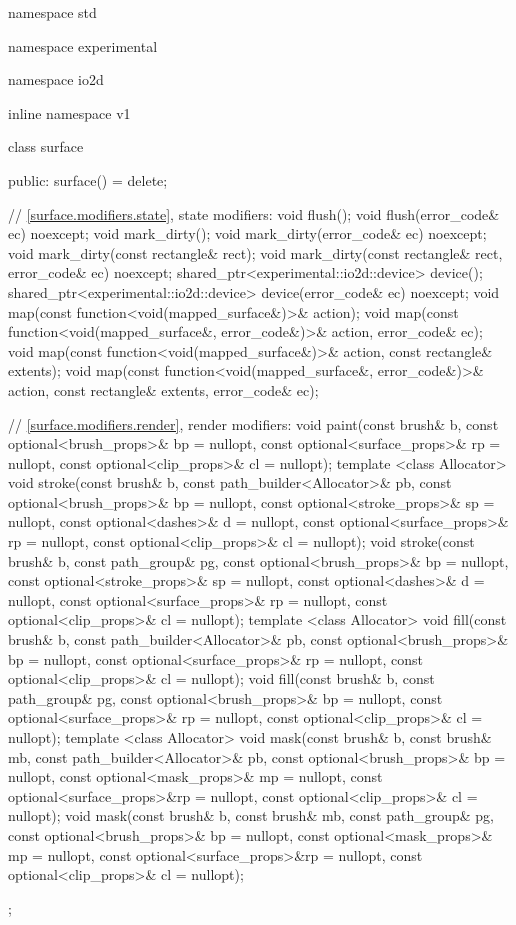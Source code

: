 \begin{codeblock}
namespace std { namespace experimental { namespace io2d { inline namespace v1 {
  class surface {
  public:
    surface() = delete;
    
    // \ref{surface.modifiers.state}, state modifiers:
    void flush();
    void flush(error_code& ec) noexcept;
    void mark_dirty();
    void mark_dirty(error_code& ec) noexcept;
    void mark_dirty(const rectangle& rect);
    void mark_dirty(const rectangle& rect, error_code& ec) noexcept;
    shared_ptr<experimental::io2d::device> device();
    shared_ptr<experimental::io2d::device> device(error_code& ec) noexcept;
    void map(const function<void(mapped_surface&)>& action);
    void map(const function<void(mapped_surface&, error_code&)>& action,
      error_code& ec);
    void map(const function<void(mapped_surface&)>& action,
      const rectangle& extents);
    void map(const function<void(mapped_surface&, error_code&)>& action,
      const rectangle& extents, error_code& ec);

    // \ref{surface.modifiers.render}, render modifiers:
    void paint(const brush& b, const optional<brush_props>& bp = nullopt,
      const optional<surface_props>& rp = nullopt,
      const optional<clip_props>& cl = nullopt);
    template <class Allocator>
    void stroke(const brush& b, const path_builder<Allocator>& pb,
      const optional<brush_props>& bp = nullopt,
      const optional<stroke_props>& sp = nullopt,
      const optional<dashes>& d = nullopt,
      const optional<surface_props>& rp = nullopt,
      const optional<clip_props>& cl = nullopt);
    void stroke(const brush& b, const path_group& pg,
      const optional<brush_props>& bp = nullopt,
      const optional<stroke_props>& sp = nullopt,
      const optional<dashes>& d = nullopt,
      const optional<surface_props>& rp = nullopt,
      const optional<clip_props>& cl = nullopt);
    template <class Allocator>
    void fill(const brush& b, const path_builder<Allocator>& pb,
      const optional<brush_props>& bp = nullopt,
      const optional<surface_props>& rp = nullopt,
      const optional<clip_props>& cl = nullopt);
    void fill(const brush& b, const path_group& pg,
      const optional<brush_props>& bp = nullopt,
      const optional<surface_props>& rp = nullopt,
      const optional<clip_props>& cl = nullopt);
    template <class Allocator>
    void mask(const brush& b, const brush& mb,
      const path_builder<Allocator>& pb,
      const optional<brush_props>& bp = nullopt,
      const optional<mask_props>& mp = nullopt,
      const optional<surface_props>&rp = nullopt,
      const optional<clip_props>& cl = nullopt);
    void mask(const brush& b, const brush& mb, const path_group& pg,
      const optional<brush_props>& bp = nullopt,
      const optional<mask_props>& mp = nullopt,
      const optional<surface_props>&rp = nullopt,
      const optional<clip_props>& cl = nullopt);
  };
} } } }
\end{codeblock}

